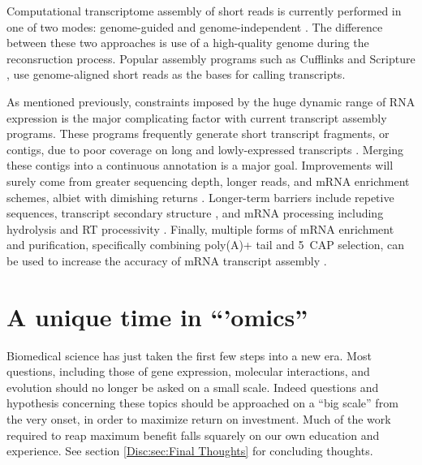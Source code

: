     Computational transcriptome assembly of short reads is currently performed in one of two modes: genome-guided and genome-independent \citep{Garber2011a}. The difference between these two approaches is use of a high-quality genome during the reconsruction process. Popular assembly programs such as Cufflinks \citep{Trapnell2010} and Scripture \citep{Guttman2010}, use genome-aligned short reads as the bases for calling transcripts.

    As mentioned previously, constraints imposed by the huge dynamic range of RNA expression is the major complicating factor with current transcript assembly programs. These programs frequently generate short transcript fragments, or contigs, due to poor coverage on long and lowly-expressed transcripts \citep{Rehrauer2013}. Merging these contigs into a continuous annotation is a major goal. Improvements will surely come from greater sequencing depth, longer reads, and mRNA enrichment schemes, albiet with dimishing returns \citep{Chang2014c}. Longer-term barriers include repetive sequences, transcript secondary structure \citep{Wan2014}, and mRNA processing including hydrolysis and RT processivity \citep{Sharon2013}. Finally, multiple forms of mRNA enrichment and purification, specifically combining poly(A)+ tail and 5\textprime~CAP selection, can be used to increase the accuracy of mRNA transcript assembly \citep{Blower2013}. 

\section{A unique time in ``'omics''}
  \label{Intro:sec:Unique Time in Omics}

  Biomedical science has just taken the first few steps into a new era. Most questions, including those of gene expression, molecular interactions, and evolution should no longer be asked on a small scale. Indeed questions and hypothesis concerning these topics should be approached on a ``big scale'' from the very onset, in order to maximize return on investment. Much of the work required to reap maximum benefit falls squarely on our own education and experience. See section \ref{Disc:sec:Final Thoughts} for concluding thoughts.


